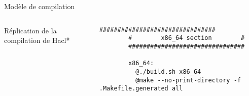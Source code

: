 \documentclass[A4,svgnames,9pt,aspectratio=169]{beamer}
\begin{document}

\begin{frame}[fragile]{Modèle de compilation}

  \begin{columns}
    \begin{column}{0.5\textwidth}
      \begin{block}{Réplication de la compilation de Hacl*}
        \large{
                }
      \end{block}
    \end{column}
    \begin{column}{0.5\textwidth}
      \begin{lstlisting}[style=MakefileStyle, gobble=10, caption={Makefile}]
        ################################
        #        x86_64 section        #
        ################################

        x86_64:
          @./build.sh x86_64
          @make --no-print-directory -f .Makefile.generated all
      \end{lstlisting}
    \end{column}
  \end{columns}
\end{frame}

\end{document}
